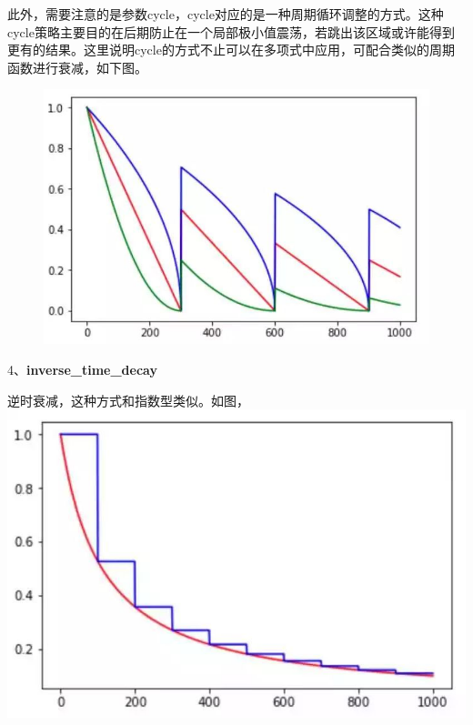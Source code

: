 此外，需要注意的是参数cycle，cycle对应的是一种周期循环调整的方式。这种cycle策略主要目的在后期防止在一个局部极小值震荡，若跳出该区域或许能得到更有的结果。这里说明cycle的方式不止可以在多项式中应用，可配合类似的周期函数进行衰减，如下图。

\begin{figure}
\centering
\includegraphics{./img/ch14/cycle衰减.jpeg}
\caption{}
\end{figure}

4、\textbf{inverse\_time\_decay}

\begin{Shaded}
\begin{Highlighting}[]
\OperatorTok{=}\OperatorTok{=}\NormalTok{)}
\end{Highlighting}
\end{Shaded}

逆时衰减，这种方式和指数型类似。如图，\includegraphics{./img/ch14/逆时衰减.jpeg}

